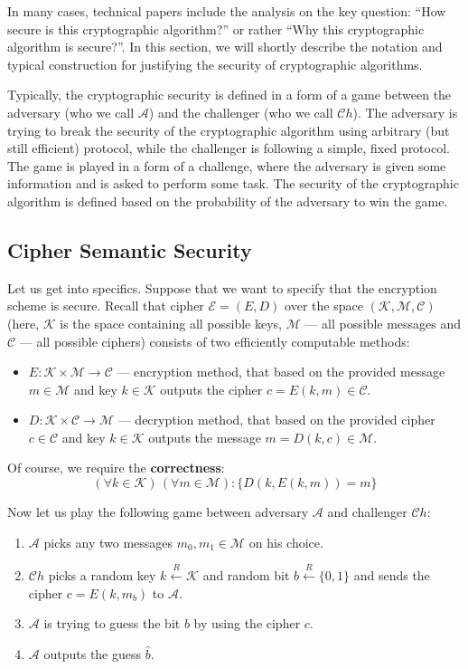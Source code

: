 \documentclass[../lecture-notes-148x210.tex]{subfiles}
\begin{document}
In many cases, technical papers include the analysis on the key question: ``How secure is this cryptographic algorithm?'' or rather ``Why this cryptographic algorithm is secure?''. In this section, we will shortly describe the notation and typical construction for justifying the security of cryptographic algorithms.

Typically, the cryptographic security is defined in a form of a game between the adversary (who we call $\mathcal{A}$) and the challenger (who we call $\mathcal{C}h$). The adversary is trying to break the security of the cryptographic algorithm using arbitrary (but still efficient) protocol, while the challenger is following a simple, fixed protocol. The game is played in a form of a challenge, where the adversary is given some information and is asked to perform some task. The security of the cryptographic algorithm is defined based on the probability of the adversary to win the game.

\subsection{Cipher Semantic Security}
Let us get into specifics. Suppose that we want to specify that the encryption scheme is secure. Recall that cipher $\mathcal{E} = (E,D)$ over the space $(\mathcal{K}, \mathcal{M}, \mathcal{C})$ (here, $\mathcal{K}$ is the space containing all possible keys, $\mathcal{M}$ --- all possible messages and $\mathcal{C}$ --- all possible ciphers) consists of two efficiently computable methods:
\begin{itemize}
    \item $E: \mathcal{K} \times \mathcal{M} \to \mathcal{C}$ --- encryption method, that based on the provided message $m \in \mathcal{M}$ and key $k \in \mathcal{K}$ outputs the cipher $c = E(k,m) \in \mathcal{C}$.
    \item $D: \mathcal{K} \times \mathcal{C} \to \mathcal{M}$ --- decryption method, that based on the provided cipher $c \in \mathcal{C}$ and key $k \in \mathcal{K}$ outputs the message $m = D(k,c) \in \mathcal{M}$.
\end{itemize}

Of course, we require the \textbf{correctness}:
\begin{equation*}
    (\forall k \in \mathcal{K}) \, (\forall m \in \mathcal{M}): \{D(k,E(k,m)) = m\}
\end{equation*}

Now let us play the following game between adversary $\mathcal{A}$ and challenger $\mathcal{C}h$:
\begin{enumerate}
    \item $\mathcal{A}$ picks any two messages $m_0,m_1 \in \mathcal{M}$ on his choice.
    \item $\mathcal{C}h$ picks a random key $k \xleftarrow{R} \mathcal{K}$ and random bit $b \xleftarrow{R} \{0,1\}$ and sends the cipher $c = E(k,m_b)$ to $\mathcal{A}$.
    \item $\mathcal{A}$ is trying to guess the bit $b$ by using the cipher $c$.
    \item $\mathcal{A}$ outputs the guess $\hat{b}$.
\end{enumerate}
\end{document}
